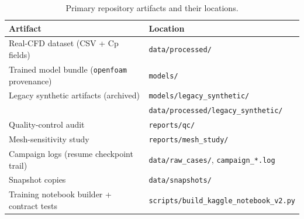 \documentclass[11pt,a4paper]{article}
\begin{document}
\begin{table}[htbp]
\centering
\caption{Primary repository artifacts and their locations.}
\label{tab:artifacts}
\begin{tabular}{ll}
\toprule
Artifact & Location \\
\midrule
Real-CFD dataset (CSV + Cp fields) & \texttt{data/processed/} \\
Trained model bundle (\texttt{openfoam} provenance) & \texttt{models/} \\
Legacy synthetic artifacts (archived) & \texttt{models/legacy\_synthetic/} \\
\phantom{Legacy synthetic artifacts (archived)} & \texttt{data/processed/legacy\_synthetic/} \\
Quality-control audit & \texttt{reports/qc/} \\
Mesh-sensitivity study & \texttt{reports/mesh\_study/} \\
Campaign logs (resume checkpoint trail) & \texttt{data/raw\_cases/}, \texttt{campaign\_*.log} \\
Snapshot copies & \texttt{data/snapshots/} \\
Training notebook builder + contract tests & \texttt{scripts/build\_kaggle\_notebook\_v2.py} \\
\bottomrule
\end{tabular}
\end{table}
\end{document}
